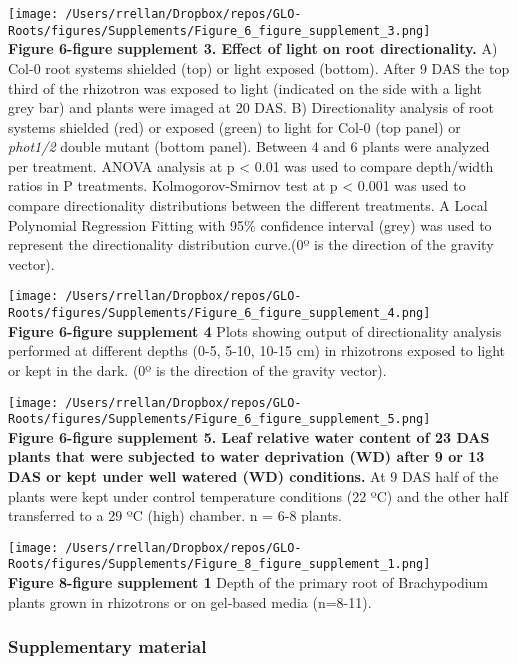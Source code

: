 \documentclass[]{article}
\begin{document}
\texttt{[image: /Users/rrellan/Dropbox/repos/GLO-Roots/figures/Supplements/Figure\_6\_figure\_supplement\_3.png]}\\\textbf{Figure
6-figure supplement 3. Effect of light on root directionality.} A) Col-0
root systems shielded (top) or light exposed (bottom). After 9 DAS the
top third of the rhizotron was exposed to light (indicated on the side
with a light grey bar) and plants were imaged at 20 DAS. B)
Directionality analysis of root systems shielded (red) or exposed
(green) to light for Col-0 (top panel) or \emph{phot1/2} double mutant
(bottom panel). Between 4 and 6 plants were analyzed per treatment.
ANOVA analysis at p \textless{} 0.01 was used to compare depth/width
ratios in P treatments. Kolmogorov-Smirnov test at p \textless{} 0.001
was used to compare directionality distributions between the different
treatments. A Local Polynomial Regression Fitting with 95\% confidence
interval (grey) was used to represent the directionality distribution
curve.(0º is the direction of the gravity vector).

\texttt{[image: /Users/rrellan/Dropbox/repos/GLO-Roots/figures/Supplements/Figure\_6\_figure\_supplement\_4.png]}\\\textbf{Figure
6-figure supplement 4} Plots showing output of directionality analysis
performed at different depths (0-5, 5-10, 10-15 cm) in rhizotrons
exposed to light or kept in the dark. (0º is the direction of the
gravity vector).

\texttt{[image: /Users/rrellan/Dropbox/repos/GLO-Roots/figures/Supplements/Figure\_6\_figure\_supplement\_5.png]}\\\textbf{Figure
6-figure supplement 5. Leaf relative water content of 23 DAS plants that
were subjected to water deprivation (WD) after 9 or 13 DAS or kept under
well watered (WD) conditions.} At 9 DAS half of the plants were kept
under control temperature conditions (22 ºC) and the other half
transferred to a 29 ºC (high) chamber. n = 6-8 plants.

\texttt{[image: /Users/rrellan/Dropbox/repos/GLO-Roots/figures/Supplements/Figure\_8\_figure\_supplement\_1.png]}\\\textbf{Figure
8-figure supplement 1} Depth of the primary root of Brachypodium plants
grown in rhizotrons or on gel-based media (n=8-11).

\subsubsection{Supplementary material}\label{supplementary-material-1}
\end{document}
